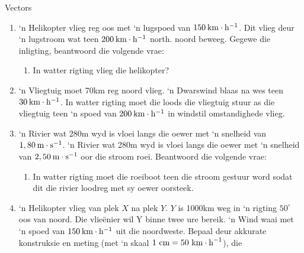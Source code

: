 \begin{eocexercises}{Vectors}
\begin{enumerate}[noitemsep, label=\textbf{\arabic*}.]
            \label{m38819*uid118}\item ‘n Helikopter vlieg reg oos met ‘n lugspoed van $150\phantom{\rule{2pt}{0ex}}\text{km}\ensuremath{\cdot}\text{h}{}^{-1}$. Dit vlieg deur ‘n lugstroom wat teen $200\phantom{\rule{2pt}{0ex}}\text{km}\ensuremath{\cdot}\text{h}{}^{-1}$ north. noord beweeg. Gegewe die inligting, beantwoord die volgende vrae:
\label{m38819*id198203}\begin{enumerate}[noitemsep, label=\textbf{\alph*}. ] 
            \label{m38819*uid119}\item In watter rigting vlieg die helikopter?
\end{enumerate}
                \label{m38819*uid122}\item ‘n Vliegtuig moet 70km reg noord vlieg. ‘n Dwarswind blaas na wes teen $30\phantom{\rule{2pt}{0ex}}\text{km}\ensuremath{\cdot}\text{h}{}^{-1}$. In watter rigting moet die loods die vliegtuig stuur as die vliegtuig teen ‘n spoed van $200\phantom{\rule{2pt}{0ex}}\text{km}\ensuremath{\cdot}\text{h}{}^{-1}$ in windstil omstandighede vlieg.
\label{m38819*uid123}\item ‘n Rivier wat 280m wyd is vloei langs die oewer met ‘n snelheid van $1,80\phantom{\rule{2pt}{0ex}}\text{m}\ensuremath{\cdot}\text{s}{}^{-1}$. ‘n Rivier wat 280m wyd is vloei langs die oewer met ‘n snelheid van $2,50\phantom{\rule{2pt}{0ex}}\text{m}\ensuremath{\cdot}\text{s}{}^{-1}$ oor die stroom roei. Beantwoord die volgende vrae:
\label{m38819*id198337}\begin{enumerate}[noitemsep, label=\textbf{\alph*}. ] 
\label{m38819*uid126}\item In watter rigting moet die roeiboot teen die stroom gestuur word sodat dit die rivier loodreg met sy oewer oorsteek.
\end{enumerate}
                \label{m38819*uid128}\item ‘n Helikopter vlieg van plek $X$ na plek $Y$. $Y$ is 1000km weg in ‘n rigting ${50}^{\circ }$ oos van noord. Die vlieënier wil Y binne twee ure bereik. ‘n Wind waai met ‘n spoed van $150\phantom{\rule{2pt}{0ex}}\text{km}\ensuremath{\cdot}\text{h}{}^{-1}$ uit die noordweste. Bepaal deur akkurate konstruksie en meting (met ‘n skaal  $1\phantom{\rule{3.33333pt}{0ex}}\text{cm}=50\phantom{\rule{3.33333pt}{0ex}}{\text{km}\ensuremath{\cdot}\text{h}}^{-1}$), die

\end{enumerate}
\end{eocexercises}
